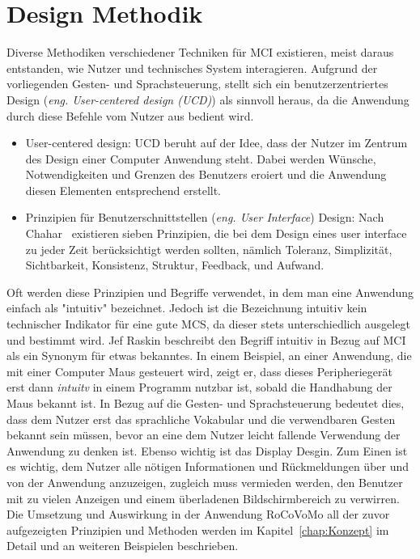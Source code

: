\section{Design Methodik}
Diverse Methodiken verschiedener Techniken f\"ur \gls{MCI} existieren, meist daraus entstanden, wie Nutzer und technisches System interagieren. Aufgrund der vorliegenden Gesten- und Sprachsteuerung, stellt sich ein benutzerzentriertes Design (\textit{eng. User-centered design (UCD)}) als sinnvoll heraus, da die Anwendung durch diese Befehle vom Nutzer aus bedient wird.
\begin{itemize}
\item User-centered design: UCD beruht auf der Idee, dass der Nutzer im Zentrum des Design einer Computer Anwendung steht. Dabei werden W\"unsche, Notwendigkeiten und Grenzen des Benutzers eroiert und die Anwendung diesen Elementen entsprechend erstellt.
\item Prinzipien f\"ur Benutzerschnittstellen (\textit{eng. User Interface}) Design: Nach Chahar~\cite{bib:Chahar} existieren sieben Prinzipien, die bei dem Design eines user interface zu jeder Zeit ber\"ucksichtigt werden sollten, n\"amlich Toleranz, Simplizit\"at, Sichtbarkeit, Konsistenz, Struktur, Feedback, und Aufwand.
\end{itemize}
Oft werden diese Prinzipien und Begriffe verwendet, in dem man eine Anwendung einfach als "intuitiv" bezeichnet. Jedoch ist die Bezeichnung intuitiv kein technischer Indikator f\"ur eine gute \gls{MCS}, da dieser stets unterschiedlich ausgelegt und bestimmt wird. Jef Raskin \cite{bib:Raskin} beschreibt den Begriff intuitiv in Bezug auf \gls{MCI} als ein Synonym f\"ur etwas bekanntes. In einem Beispiel, an einer Anwendung, die mit einer Computer Maus gesteuert wird, zeigt er, dass dieses Peripherieger\"at erst dann \textit{intuitv} in einem Programm nutzbar ist, sobald die Handhabung der Maus bekannt ist. In Bezug auf die Gesten- und Sprachsteuerung bedeutet dies, dass dem Nutzer erst das sprachliche Vokabular und die verwendbaren Gesten bekannt sein m\"ussen, bevor an eine dem Nutzer leicht fallende Verwendung der Anwendung zu denken ist.
\newline
Ebenso wichtig ist das Display Desgin. Zum Einen ist es wichtig, dem Nutzer alle n\"otigen Informationen und R\"uckmeldungen \"uber und von der Anwendung anzuzeigen, zugleich muss vermieden werden, den Benutzer mit zu vielen Anzeigen und einem \"uberladenen Bildschirmbereich zu verwirren.
\newline
Die Umsetzung und Auswirkung in der Anwendung RoCoVoMo all der zuvor aufgezeigten Prinzipien und Methoden werden im Kapitel~\ref{chap:Konzept} im Detail und an weiteren Beispielen beschrieben.